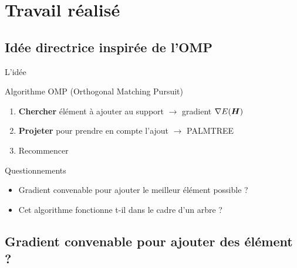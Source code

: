 \section{Travail réalisé}

\subsection{Idée directrice inspirée de l'OMP}
\begin{frame}{L'idée}
\begin{block}{Algorithme OMP (Orthogonal Matching Pursuit)}
	\begin{enumerate}
		\item \textbf{Chercher} élément à ajouter au support $\rightarrow$ \alert{gradient $\nabla E(\bm{H})$}
		\item \textbf{Projeter} pour prendre en compte l'ajout $\rightarrow$ \alert{PALMTREE}
		\item Recommencer
	\end{enumerate}
\end{block}
\begin{exampleblock}{Questionnements}
\begin{itemize}
	\item Gradient convenable pour ajouter le meilleur élément possible ?
	\item Cet algorithme fonctionne t-il dans le cadre d'un arbre ?
\end{itemize}
\end{exampleblock}
\end{frame}


\subsection{Gradient convenable pour ajouter des élément ?}

